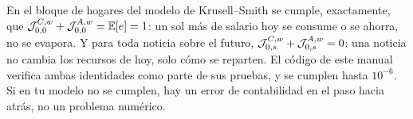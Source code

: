 \begin{trampa}
En el bloque de hogares del modelo de Krusell--Smith se cumple, exactamente, que
$\mathcal{J}^{C,w}_{0,0} + \mathcal{J}^{A,w}_{0,0} = \mathbb{E}[e] = 1$: un sol más de salario hoy se
consume o se ahorra, no se evapora. Y para toda noticia sobre el futuro,
$\mathcal{J}^{C,w}_{0,s} + \mathcal{J}^{A,w}_{0,s} = 0$: una noticia no cambia los recursos de hoy,
solo cómo se reparten. El código de este manual verifica ambas identidades como
parte de sus pruebas, y se cumplen hasta $10^{-6}$. Si en tu modelo no se
cumplen, hay un error de contabilidad en el paso hacia atrás, no un problema
numérico.
\end{trampa}
